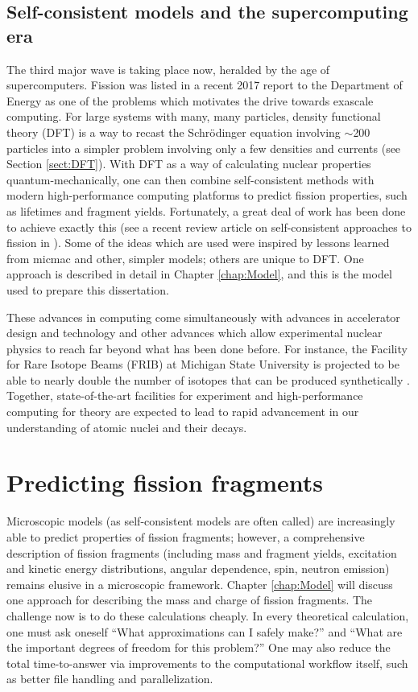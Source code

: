 \subsection{Self-consistent models and the supercomputing era}
The third major wave is taking place now, heralded by the age of supercomputers. Fission was listed in a recent 2017 report to the Department of Energy \cite{Carlson2017} as one of the problems which motivates the drive towards exascale computing. For large systems with many, many particles, density functional theory (DFT) is a way to recast the Schr\"{o}dinger equation involving $\sim$200 particles into a simpler problem involving only a few densities and currents (see Section \ref{sect:DFT}). With DFT as a way of calculating nuclear properties quantum-mechanically, one can then combine self-consistent methods with modern high-performance computing platforms to predict fission properties, such as lifetimes and fragment yields. Fortunately, a great deal of work has been done to achieve exactly this (see a recent review article on self-consistent approaches to fission in \cite{Schunck2016}). Some of the ideas which are used were inspired by lessons learned from micmac and other, simpler models; others are unique to DFT. One approach is described in detail in Chapter \ref{chap:Model}, and this is the model used to prepare this dissertation.

These advances in computing come simultaneously with advances in accelerator design and technology and other advances which allow experimental nuclear physics to reach far beyond what has been done before. For instance, the Facility for Rare Isotope Beams (FRIB) at Michigan State University is projected to be able to nearly double the number of isotopes that can be produced synthetically \cite{Baumann2016}. Together, state-of-the-art facilities for experiment and high-performance computing for theory are expected to lead to rapid advancement in our understanding of atomic nuclei and their decays.

\section{Predicting fission fragments}
Microscopic models (as self-consistent models are often called) are increasingly able to predict properties of fission fragments; however, a comprehensive description of fission fragments (including mass and fragment yields, excitation and kinetic energy distributions, angular dependence, spin, neutron emission) remains elusive in a microscopic framework. Chapter \ref{chap:Model} will discuss one approach for describing the mass and charge of fission fragments. The challenge now is to do these calculations cheaply. In every theoretical calculation, one must ask oneself ``What approximations can I safely make?'' and ``What are the important degrees of freedom for this problem?'' One may also reduce the total time-to-answer via improvements to the computational workflow itself, such as better file handling and parallelization.

